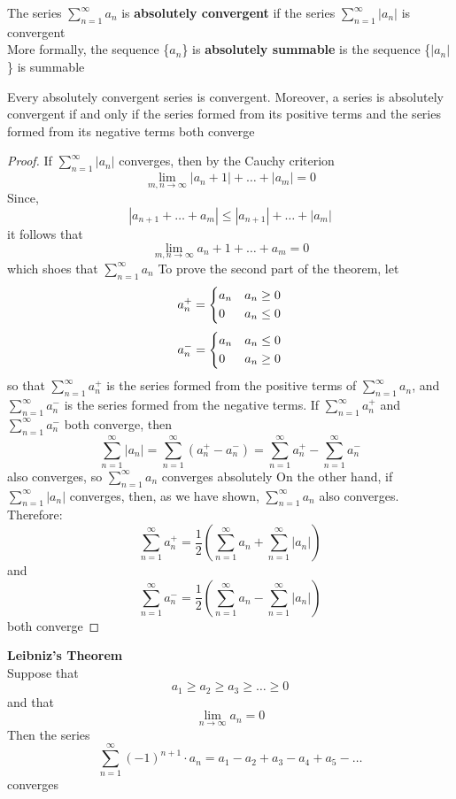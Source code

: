 \begin{definition}
    The series $\sum_{n=1}^\infty a_n$ is \textbf{absolutely convergent} if the series $\sum_{n=1}^\infty |a_n|$ is convergent\\
    More formally, the sequence \{$a_n$\} is \textbf{absolutely summable} is the sequence \{$|a_n|$\} is summable
\end{definition}
\begin{theorem}
    Every absolutely convergent series is convergent. Moreover, a series is absolutely convergent if and only if the series formed from its positive terms and the series formed from its negative terms both converge
\end{theorem}
\begin{proof}
    If $\sum_{n=1}^\infty |a_n|$ converges, then by the Cauchy criterion
    $$\lim_{m,n\to\infty}|a_n+1|+ \dots + |a_m| =0 $$
    Since,
    $$|a_{n+1} + \dots + a_m| \leq |a_{n+1}| + \dots + |a_m|$$
    it follows that 
    $$\lim_{m,n\to\infty}a_n+1+ \dots + a_m =0 $$
    which shoes that $\sum_{n=1}^\infty a_n$
    To prove the second part of the theorem, let 
    $$a_n^+ = 
    \begin{dcases}
        a_n & a_n \geq 0 \\
        0 & a_n \leq 0
    \end{dcases}$$
    $$a_n^- = 
    \begin{dcases}
        a_n & a_n \leq0 \\
        0 & a_n \geq 0
    \end{dcases}$$
    so that $\sum_{n=1}^\infty a_n^+$ is the series formed from the positive terms of $\sum_{n=1}^\infty a_n$, and $\sum_{n=1}^\infty a_n^-$ is the series formed from the negative terms.
    If $\sum_{n=1}^\infty a_n^+$ and $\sum_{n=1}^\infty a_n^-$ both converge, then
    $$\sum_{n=1}^\infty |a_n| = \sum_{n=1}^\infty (a_n^+ - a_n^-) = \sum_{n=1}^\infty a_n^+ - \sum_{n=1}^\infty a_n^-$$
    also converges, so $\sum_{n=1}^\infty a_n$ converges absolutely \newpage
    On the other hand, if $\sum_{n=1}^\infty |a_n|$ converges, then, as we have shown, $\sum_{n=1}^\infty a_n$ also converges. Therefore:
    $$ \sum_{n=1}^\infty a_n^+ = \frac{1}{2}\left( \sum_{n=1}^\infty a_n + \sum_{n=1}^\infty |a_n| \right)$$
    and 
    $$\sum_{n=1}^\infty a_n^- = \frac{1}{2} \left( \sum_{n=1}^\infty a_n - \sum_{n=1}^\infty|a_n| \right)$$
    both converge
\end{proof} \bigskip

\begin{theorem}
    \textbf{Leibniz's Theorem} \\
    Suppose that 
    $$a_1 \geq a_2 \geq a_3 \geq \dots \geq 0$$
    and that 
    $$\lim_{n\to \infty} a_n =0$$
    Then the series 
    $$\sum_{n=1}^\infty (-1)^{n+1} \cdot a_n = a_1 - a_2 + a_3 - a_4 + a_5 - \dots $$
    converges
\end{theorem}


